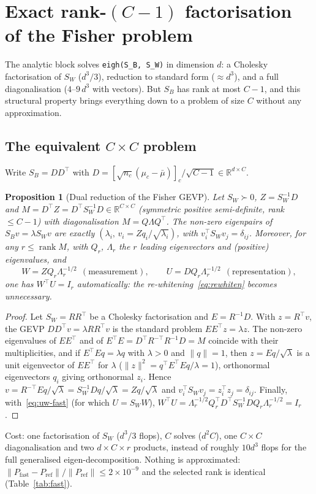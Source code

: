 \documentclass[11pt,a4paper]{article}
\theoremstyle{plain}
\newtheorem{proposition}{Proposition}
\theoremstyle{definition}
\theoremstyle{remark}
\newcommand{\R}{\mathbb R}
\newcommand{\rank}{\operatorname{rank}}
\newcommand{\T}{\top}
\begin{document}
\section{Exact rank-\texorpdfstring{$(C-1)$}{(C-1)} factorisation of the Fisher problem}
\label{sec:fast}
The analytic block solves \texttt{eigh(S\_B, S\_W)} in dimension $d$: a
Cholesky factorisation of $S_W$ ($d^3/3$), reduction to standard form
($\approx d^3$), and a full diagonalisation ($4$--$9\,d^3$ with vectors). But
$S_B$ has rank at most $C-1$, and this structural property brings everything
down to a problem of size $C$ without any approximation.

\subsection{The equivalent \texorpdfstring{$C\times C$}{CxC} problem}
Write $S_B=DD^\T$ with
$D=[\sqrt{n_c}(\mu_c-\bar\mu)]_c/\sqrt{C-1}\in\R^{d\times C}$.
\begin{proposition}[Dual reduction of the Fisher GEVP]
\label{prop:dual}
Let $S_W\succ0$, $Z=S_W^{-1}D$ and $M=D^\T Z=D^\T S_W^{-1}D\in\R^{C\times C}$
(symmetric positive semi-definite, rank $\le C-1$) with diagonalisation
$M=Q\Lambda Q^\T$. The \emph{non-zero} eigenpairs of $S_Bv=\lambda S_Wv$ are
exactly $(\lambda_i,\,v_i=Zq_i/\sqrt{\lambda_i})$, with $v_i^\T S_Wv_j=\delta_{ij}$.
Moreover, for any $r\le\rank M$, with $Q_r$, $\Lambda_r$ the $r$ leading
eigenvectors and (positive) eigenvalues, and
\begin{equation}
  W=ZQ_r\Lambda_r^{-1/2}\ \ (\text{measurement}),\qquad
  U=DQ_r\Lambda_r^{-1/2}\ \ (\text{representation}),
  \label{eq:uw-fast}
\end{equation}
one has $W^\T U=I_r$ automatically: the re-whitening~\eqref{eq:rewhiten}
becomes unnecessary.
\end{proposition}
\begin{proof}
Let $S_W=RR^\T$ be a Cholesky factorisation and $E=R^{-1}D$. With $z=R^\T v$,
the GEVP $DD^\T v=\lambda RR^\T v$ is the standard problem $EE^\T z=\lambda z$.
The non-zero eigenvalues of $EE^\T$ and of $E^\T E=D^\T R^{-\T}R^{-1}D=M$
coincide with their multiplicities, and if $E^\T Eq=\lambda q$ with
$\lambda>0$ and $\|q\|=1$, then $z=Eq/\sqrt\lambda$ is a unit eigenvector of
$EE^\T$ for $\lambda$ ($\|z\|^2=q^\T E^\T Eq/\lambda=1$), orthonormal
eigenvectors $q_i$ giving orthonormal $z_i$. Hence
$v=R^{-\T}Eq/\sqrt\lambda=S_W^{-1}Dq/\sqrt\lambda=Zq/\sqrt\lambda$ and
$v_i^\T S_Wv_j=z_i^\T z_j=\delta_{ij}$. Finally, with~\eqref{eq:uw-fast}
(for which $U=S_WW$),
$W^\T U=\Lambda_r^{-1/2}Q_r^\T D^\T S_W^{-1}DQ_r\Lambda_r^{-1/2}=I_r$.
\end{proof}
Cost: one factorisation of $S_W$ ($d^3/3$ flops), $C$ solves ($d^2C$), one
$C\times C$ diagonalisation and two $d\times C\times r$ products, instead of
roughly $10d^3$ flops for the full generalised eigen-decomposition. Nothing
is approximated:
$\|P_{\mathrm{fast}}-P_{\mathrm{ref}}\|/\|P_{\mathrm{ref}}\|\le2\times10^{-9}$
and the selected rank is identical (Table~\ref{tab:fast}).
\end{document}
